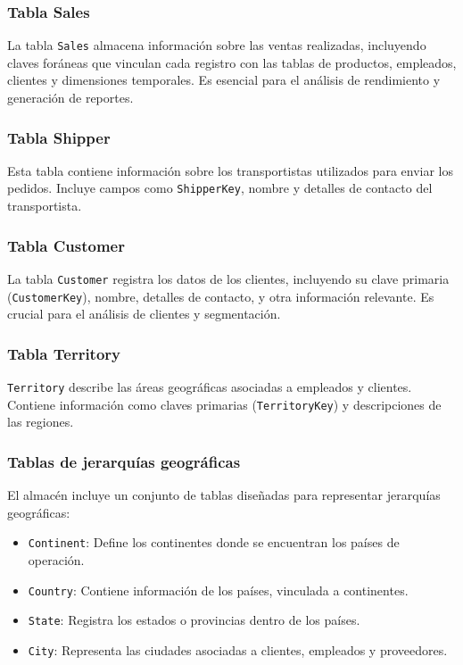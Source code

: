 \documentclass{article}
\begin{document}
	\subsubsection{Tabla Sales}
	La tabla \texttt{Sales} almacena información sobre las ventas realizadas, incluyendo claves foráneas que vinculan cada registro con las tablas de productos, empleados, clientes y dimensiones temporales. Es esencial para el análisis de rendimiento y generación de reportes.
	
	\subsubsection{Tabla Shipper}
	Esta tabla contiene información sobre los transportistas utilizados para enviar los pedidos. Incluye campos como \texttt{ShipperKey}, nombre y detalles de contacto del transportista.
	
	\subsubsection{Tabla Customer}
	La tabla \texttt{Customer} registra los datos de los clientes, incluyendo su clave primaria (\texttt{CustomerKey}), nombre, detalles de contacto, y otra información relevante. Es crucial para el análisis de clientes y segmentación.
	
	\subsubsection{Tabla Territory}
	\texttt{Territory} describe las áreas geográficas asociadas a empleados y clientes. Contiene información como claves primarias (\texttt{TerritoryKey}) y descripciones de las regiones.
	
	\subsubsection{Tablas de jerarquías geográficas}
	El almacén incluye un conjunto de tablas diseñadas para representar jerarquías geográficas:
	
	\begin{itemize}
		\item \texttt{Continent}: Define los continentes donde se encuentran los países de operación.
		\item \texttt{Country}: Contiene información de los países, vinculada a continentes.
		\item \texttt{State}: Registra los estados o provincias dentro de los países.
		\item \texttt{City}: Representa las ciudades asociadas a clientes, empleados y proveedores.
	\end{itemize}
	
\end{document}

